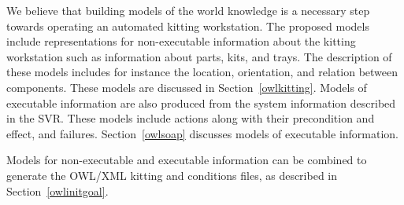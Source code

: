 We believe that building models of the world knowledge is a necessary step towards 
operating an automated kitting workstation. The proposed models include 
representations for non-executable information about the kitting workstation 
such as information about parts, kits, and trays. The description of these 
models includes for instance the location, orientation, and relation 
between components. These models are discussed in Section~\ref{owlkitting}. 
Models of executable information are also produced from the system 
information described in the SVR. These models include actions along 
with their precondition and effect, and failures. 
Section~\ref{owlsoap} discusses models of executable information.

Models for non-executable and executable information can be 
combined to generate the OWL/XML kitting  and  
conditions files, as described in Section~\ref{owlinitgoal}.

